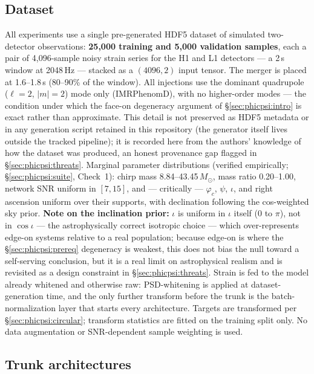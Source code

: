 \subsection{Dataset}
\label{sec:phicpsi:dataset}

All experiments use a single pre-generated HDF5 dataset of simulated two-detector observations: \textbf{25{,}000 training and 5{,}000 validation samples}, each a pair of 4{,}096-sample noisy strain series for the H1 and L1 detectors --- a 2\,s window at 2048\,Hz --- stacked as a $(4096, 2)$ input tensor.
The merger is placed at 1.6--1.8\,s (80--90\% of the window).
All injections use the dominant quadrupole ($\ell=2$, $|m|=2$) mode only (IMRPhenomD), with no higher-order modes --- the condition under which the face-on degeneracy argument of \S\ref{sec:phicpsi:intro} is exact rather than approximate.
This detail is not preserved as HDF5 metadata or in any generation script retained in this repository (the generator itself lives outside the tracked pipeline); it is recorded here from the authors' knowledge of how the dataset was produced, an honest provenance gap flagged in \S\ref{sec:phicpsi:threats}.
Marginal parameter distributions (verified empirically; \S\ref{sec:phicpsi:suite}, Check~1): chirp mass 8.84--43.45\,$M_\odot$, mass ratio 0.20--1.00, network SNR uniform in $[7, 15]$, and --- critically --- $\varphi_c$, $\psi$, $\iota$, and right ascension uniform over their supports, with declination following the cos-weighted sky prior.
\textbf{Note on the inclination prior:} $\iota$ is uniform in $\iota$ itself ($0$ to $\pi$), not in $\cos\iota$ --- the astrophysically correct isotropic choice --- which over-represents edge-on systems relative to a real population; because edge-on is where the \S\ref{sec:phicpsi:prereq} degeneracy is weakest, this does not bias the null toward a self-serving conclusion, but it is a real limit on astrophysical realism and is revisited as a design constraint in \S\ref{sec:phicpsi:threats}.
Strain is fed to the model already whitened and otherwise raw: PSD-whitening is applied at dataset-generation time, and the only further transform before the trunk is the batch-normalization layer that starts every architecture.
Targets are transformed per \S\ref{sec:phicpsi:circular}; transform statistics are fitted on the training split only.
No data augmentation or SNR-dependent sample weighting is used.

\subsection{Trunk architectures}
\label{sec:phicpsi:trunks}

